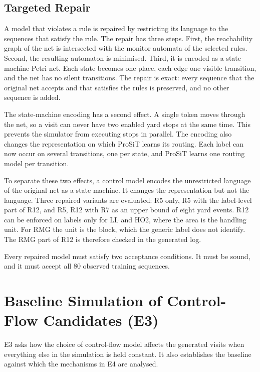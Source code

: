 \subsection{Targeted Repair}

A model that violates a rule is repaired by restricting its language to
the sequences that satisfy the rule. The repair has three steps. First,
the reachability graph of the net is intersected with the monitor
automata of the selected rules. Second, the resulting automaton is
minimised. Third, it is encoded as a state-machine Petri net. Each state
becomes one place, each edge one visible transition, and the net has no
silent transitions. The repair is exact: every sequence that the
original net accepts and that satisfies the rules is preserved, and no
other sequence is added.

The state-machine encoding has a second effect. A single token moves
through the net, so a visit can never have two enabled yard stops at
the same time. This prevents the simulator from executing stops in
parallel. The encoding also changes the representation on which ProSiT
learns its routing. Each label can now occur on several transitions,
one per state, and ProSiT learns one routing model per transition.

To separate these two effects, a control model encodes the unrestricted
language of the original net as a state machine. It changes the
representation but not the language. Three repaired variants are
evaluated: R5 only, R5 with the label-level part of R12, and R5, R12
with R7 as an upper bound of eight yard events. R12 can be enforced on
labels only for LL and HO2, where the area is the handling unit. For RMG
the unit is the block, which the generic label does not identify. The
RMG part of R12 is therefore checked in the generated log.

Every repaired model must satisfy two acceptance conditions. It must be
sound, and it must accept all 80 observed training sequences.

\section{Baseline Simulation of Control-Flow Candidates (E3)}
\label{sec:exp_baseline}

E3 asks how the choice of control-flow model affects the generated
visits when everything else in the simulation is held constant. It also
establishes the baseline against which the mechanisms in E4 are
analysed.


